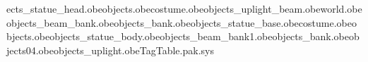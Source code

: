 ects\debris_statue_head.obe objects\floorpolisher.obe costume\bandana.obe objects\painting_uplight_beam.obe world.obe objects\floor_beam_bank.obe objects\lazer_bank.obe objects\debris_statue_base.obe costume\ninjabelt.obe objects\start.obe objects\debris_statue_body.obe objects\big_beam_bank1.obe objects\statue_bank.obe objects\object04.obe objects\painting_uplight.obe TagTable.pak.sys 
